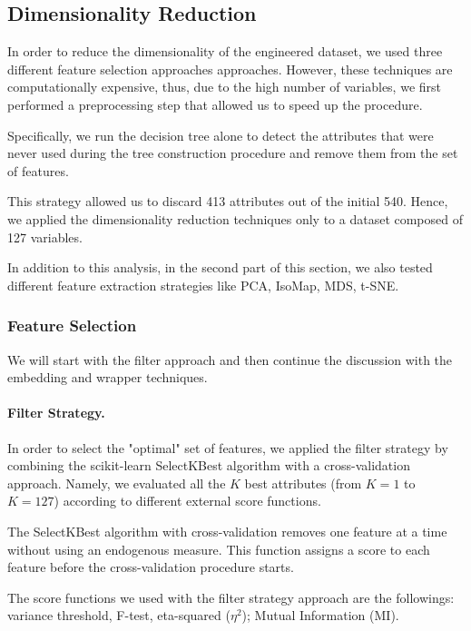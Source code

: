 \documentclass[10pt, a4paper, twocolumn]{article}
\begin{document}
\subsection{Dimensionality Reduction}

In order to reduce the dimensionality of the engineered dataset, we used three different feature selection approaches approaches. However, these techniques are computationally expensive, thus, due to the high number of variables, we first performed a preprocessing step that allowed us to speed up the procedure. 

Specifically, we run the decision tree alone to detect the attributes that were never used during the tree construction procedure and remove them from the set of features. 

This strategy allowed us to discard 413 attributes out of the initial 540. Hence, we applied the dimensionality reduction techniques only to a dataset composed of 127 variables.

In addition to this analysis, in the second part of this section, we also tested different feature extraction strategies like PCA, IsoMap, MDS, t-SNE. 

\subsubsection{Feature Selection}\label{subsec:feature_selection}

We will start with the filter approach and then continue the discussion with the embedding and wrapper techniques. 

\paragraph{Filter Strategy.}
In order to select the "optimal" set of features, we applied the filter strategy by combining the scikit-learn SelectKBest algorithm with a cross-validation approach. Namely, we evaluated all the $K$ best attributes (from $K = 1$ to $K = 127$) according to different external score functions.

The SelectKBest algorithm with cross-validation removes one feature at a time without using an endogenous measure. This function assigns a score to each feature before the cross-validation procedure starts. 

The score functions we used with the filter strategy approach are the followings: variance threshold, F-test, eta-squared ($\eta^2$); Mutual Information (MI).
\end{document}
